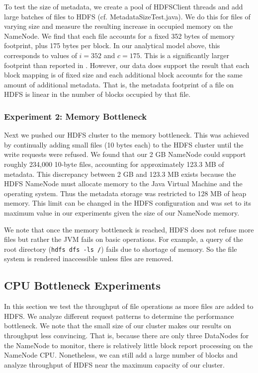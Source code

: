 \documentclass[11pt, a4paper]{article}
\begin{document}
\begin{multicols*}{2}
To test the size of metadata, we create a pool of HDFSClient threads and add large batches of files to HDFS (cf. MetadataSizeTest.java). We do this for files of varying size and measure the resulting increase in occupied memory on the NameNode. We find that each file accounts for a fixed 352 bytes of memory footprint, plus 175 bytes per block. In our analytical model above, this corresponds to values of $i = 352$ and $c = 175$. This is a significantly larger footprint than reported in \cite{HdfsScale}. However, our data does support the result that each block mapping is of fixed size and each additional block accounts for the same amount of additional metadata. That is, the metadata footprint of a file on HDFS is linear in the number of blocks occupied by that file.

\subsubsection{Experiment 2: Memory Bottleneck}\label{MemoryBottleneck}
Next we pushed our HDFS cluster to the memory bottleneck. This was achieved by continually adding small files (10 bytes each) to the HDFS cluster until the write requests were refused. We found that our 2 GB NameNode could support roughly 234,000 10-byte files, accounting for approximately 123.3 MB of metadata. This discrepancy between 2 GB and 123.3 MB exists because the HDFS NameNode must allocate memory to the Java Virtual Machine and the operating system. Thus the metadata storage was restricted to 128 MB of heap memory. This limit can be changed in the HDFS configuration and was set to its maximum value in our experiments given the size of our NameNode memory.

We note that once the memory bottleneck is reached, HDFS does not refuse more files but rather the JVM fails on basic operations. For example, a query of the root directory (\texttt{hdfs dfs -ls /}) fails due to shortage of memory. So the file system is rendered inaccessible unless files are removed.

\subsection{CPU Bottleneck Experiments}\label{CPUBottleneck}
In this section we test the throughput of file operations as more files are added to HDFS. We analyze different request patterns to determine the performance bottleneck. We note that the small size of our cluster makes our results on throughput less convincing. That is, because there are only three DataNodes for the NameNode to monitor, there is relatively little block report processing on the NameNode CPU. Nonetheless, we can still add a large number of blocks and analyze throughput of HDFS near the maximum capacity of our cluster.


\end{multicols*}
\end{document}
